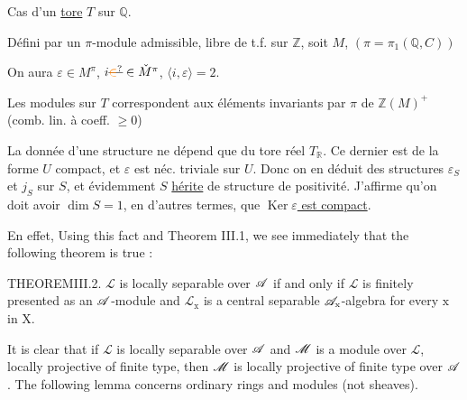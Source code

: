 Cas d'un \uline{tore} $T$ sur $\mathbb Q$.

Défini par un $\pi$-module admissible, libre de t.f. sur $\mathbb Z$, soit $M$, $(\pi=\pi_1(\mathbb Q,C))$

On aura $\varepsilon\in M^\pi$, $i\deleted{\unsure{\in}}\in\check M^\pi$, $\langle i,\varepsilon\rangle=2$.

Les modules sur $T$ correspondent aux éléments invariants par $\pi$ de $\mathbb Z(M)^+$ (comb. lin. à coeff. $\geq 0$)


La donnée d'une structure   ne dépend que du tore réel $T_{\mathbb R}$. Ce dernier est de la forme   $U$ compact,   et $\varepsilon$ est néc. triviale sur $U$. Donc on en déduit des structures $\varepsilon_S$ et $j_S$ sur $S$, et évidemment $S$ \uline{hérite} de structure de positivité. J'affirme qu'on doit avoir $\dim S=1$, en d'autres termes, que \uline{$\operatorname{Ker}\varepsilon$ est compact}.

En effet, 
Using this fact and Theorem III.1, we see immediately that the following theorem is true :

THEOREMIII.2. $\mathscr{L}$ is locally separable over $\mathscr{A}$ if and only if $\mathscr{L}$ is finitely presented as an $\mathscr{A}$-module and $\mathscr{L}_{\mathrm x}$ is a central separable $\mathscr{A}_{\mathrm x}$-algebra for every $\mathrm x$ in $\mathrm X$.

It is clear that if $\mathscr{L}$ is locally separable over $\mathscr{A}$ and $\mathscr{M}$ is a module over $\mathscr{L}$, locally projective of finite type, then $\mathscr{M}$ is locally projective of finite type over $\mathscr{A}$. The following lemma concerns ordinary rings and modules (not sheaves).


